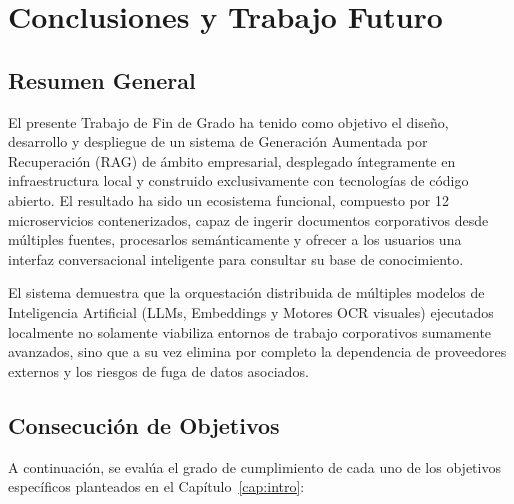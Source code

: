 \chapter{Conclusiones y Trabajo Futuro}
\label{cap:conclusiones}

\section{Resumen General}

El presente Trabajo de Fin de Grado ha tenido como objetivo el diseño, desarrollo y despliegue de un sistema de Generación Aumentada por Recuperación (RAG) de ámbito empresarial, desplegado íntegramente en infraestructura local y construido exclusivamente con tecnologías de código abierto. El resultado ha sido un ecosistema funcional, compuesto por 12 microservicios contenerizados, capaz de ingerir documentos corporativos desde múltiples fuentes, procesarlos semánticamente y ofrecer a los usuarios una interfaz conversacional inteligente para consultar su base de conocimiento.

El sistema demuestra que la orquestación distribuida de múltiples modelos de Inteligencia Artificial (LLMs, Embeddings y Motores OCR visuales) ejecutados localmente no solamente viabiliza entornos de trabajo corporativos sumamente avanzados, sino que a su vez elimina por completo la dependencia de proveedores externos y los riesgos de fuga de datos asociados.

\section{Consecución de Objetivos}

A continuación, se evalúa el grado de cumplimiento de cada uno de los objetivos específicos planteados en el Capítulo~\ref{cap:intro}:

